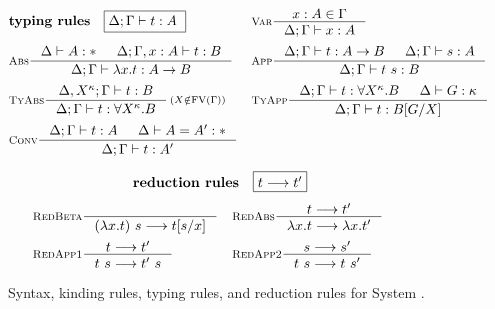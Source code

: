 \begin{figure}
\begin{singlespace}
\begin{align*}
&\textbf{typing rules} \quad \framebox{$ \Delta;\Gamma |- t : A $ }
&&\inference[\sc Var]{x:A \in \Gamma}{\Delta;\Gamma |- x:A}
	\phantom{\frac{A}{\frac{A}{A^A}}} \\
& \inference[\sc Abs]{\Delta |- A:* & \Delta;\Gamma,x:A |- t : B}
                     {\Delta;\Gamma |- \l x   .t : A -> B}
&&\inference[\sc App]{\Delta;\Gamma |- t : A -> B & \Delta;\Gamma |- s : A}
                     {\Delta;\Gamma |- t~s : B}
	\phantom{\frac{A}{\frac{A}{A^A}}} \\
& \inference[\sc TyAbs]{\Delta,X^\kappa;\Gamma |- t : B}
                       {\Delta;\Gamma |- t : \forall X^\kappa.B}
	 \begin{smallmatrix}(X\notin\FV(\Gamma))\end{smallmatrix}
&&\inference[\sc TyApp]{\Delta;\Gamma |- t : \forall X^\kappa.B & \Delta |- G:\kappa}
                       {\Delta;\Gamma |- t : B[G/X]}
	\phantom{\frac{A}{\frac{A}{A^A}}} \\
& \inference[\sc Conv]{\Delta;\Gamma |- t : A & \Delta |- A = A' : *}
                      {\Delta;\Gamma |- t : A'}
\end{align*}

\[\textbf{reduction rules}\quad\framebox{$ t --> t' $}\]
\vspace*{-1.5em}
\begin{align*}
& \inference[\sc RedBeta]{}{(\l x   .t)~s --> t[s/x]}
&&\inference[\sc RedAbs]{t --> t'}{\l x   .t --> \l x   .t'}
	\phantom{\frac{A}{\frac{A}{A^A}}} \\
& \inference[\sc RedApp1]{t --> t'}{t~s --> t'~s}
&&\inference[\sc RedApp2]{s --> s'}{t~s --> t~s'} \\
\end{align*}

\caption{Syntax, kinding rules, typing rules, and reduction rules for System \Fw.}
\label{fig:fw}
\end{singlespace}
\end{figure}

